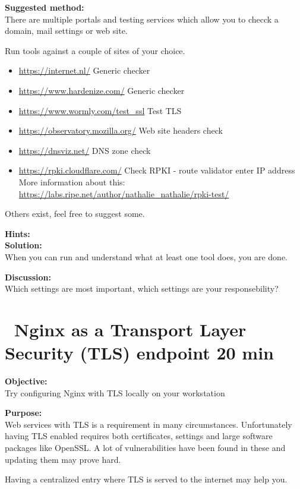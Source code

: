 \documentclass[a4paper,11pt,notitlepage]{report}
\begin{document}
{\bf Suggested method:}\\
There are multiple portals and testing services which allow you to checck a domain,
mail settings or web site.

Run tools against a couple of sites of your choice.
\begin{itemize}
\item \url{https://internet.nl/} Generic checker
\item \url{https://www.hardenize.com/} Generic checker
\item \url{https://www.wormly.com/test_ssl} Test TLS
\item \url{https://observatory.mozilla.org/} Web site headers check
\item \url{https://dnsviz.net/} DNS zone check
\item \url{https://rpki.cloudflare.com/} Check RPKI - route validator enter
IP address\\
More information about this: \url{https://labs.ripe.net/author/nathalie_nathalie/rpki-test/}
\end{itemize}

Others exist, feel free to suggest some.

{\bf Hints:}\\

{\bf Solution:}\\
When you can run and understand what at least one tool does, you are done.

{\bf Discussion:}\\
Which settings are most important, which settings are your responsebility?


\chapter{\faExclamationTriangle\ Nginx as a Transport Layer Security (TLS) endpoint 20 min}
\label{ex:nginx-tls}

{\bf Objective:}\\
Try configuring Nginx with TLS locally on your workstation


{\bf Purpose:}\\
Web services with TLS is a requirement in many circumstances. Unfortunately having TLS enabled requires both certificates, settings and large software packages like OpenSSL. A lot of vulnerabilities have been found in these and updating them may prove hard.

Having a centralized entry where TLS is served to the internet may help you.
\end{document}
